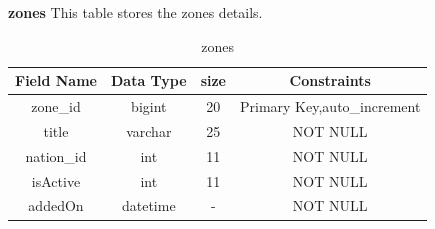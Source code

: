 \textbf{zones} This table stores the zones details.\nolinebreak
\begin{table}[hp]
\centering
\begin{tabular}{|c|c|c|c|}
\hline
\textbf{Field Name}  & \textbf{Data Type}  & \textbf{size} &\textbf{Constraints}  \\
\hline
zone\_id &	bigint &	20 & Primary Key,auto\_increment \\\hline
title &	varchar &	25 & NOT NULL \\\hline
 nation\_id &	int &	11 & NOT NULL \\\hline
isActive &	 int &	11 & NOT NULL \\\hline
addedOn &	datetime &	- & NOT NULL \\\hline

\end{tabular}
\caption{zones}
\end{table}

